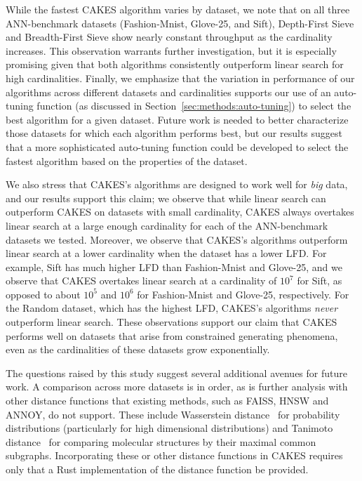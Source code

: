 While the fastest CAKES algorithm varies by dataset, we note that on all three ANN-benchmark datasets (Fashion-Mnist, Glove-25, and Sift), Depth-First Sieve and Breadth-First Sieve show nearly constant throughput as the cardinality increases.
This observation warrants further investigation, but it is especially promising given that both algorithms consistently outperform linear search for high cardinalities.
Finally, we emphasize that the variation in performance of our algorithms across different datasets and cardinalities supports our use of an auto-tuning function (as discussed in Section~\ref{sec:methods:auto-tuning}) to select the best algorithm for a given dataset.
Future work is needed to better characterize those datasets for which each algorithm performs best, but our results suggest that a more sophisticated auto-tuning function could be developed to select the fastest algorithm based on the properties of the dataset.

We also stress that CAKES's algorithms are designed to work well for \textit{big} data, and our results support this claim;
we observe that while linear search can outperform CAKES on datasets with small cardinality, CAKES always overtakes linear search at a large enough cardinality for each of the ANN-benchmark datasets we tested.
Moreover, we observe that CAKES's algorithms outperform linear search at a lower cardinality when the dataset has a lower LFD.
For example, Sift has much higher LFD than Fashion-Mnist and Glove-25, and we observe that CAKES overtakes linear search at a cardinality of $10^7$ for Sift, as opposed to about $10^5$ and $10^6$ for Fashion-Mnist and Glove-25, respectively.
For the Random dataset, which has the highest LFD, CAKES's algorithms \textit{never} outperform linear search.
These observations support our claim that CAKES performs well on datasets that arise from constrained generating phenomena, even as the cardinalities of these datasets grow exponentially. 




The questions raised by this study suggest several additional avenues for future work.
A comparison across more datasets is in order, as is further analysis with other distance functions that existing methods, such as FAISS, HNSW and ANNOY, do not support. These include Wasserstein distance~\cite{vallender1974calculation} for probability distributions (particularly for high dimensional distributions) and Tanimoto distance~\cite{bajusz2015tanimoto} for comparing molecular structures by their maximal common subgraphs.
Incorporating these or other distance functions in CAKES requires only that a Rust implementation of the distance function be provided.

